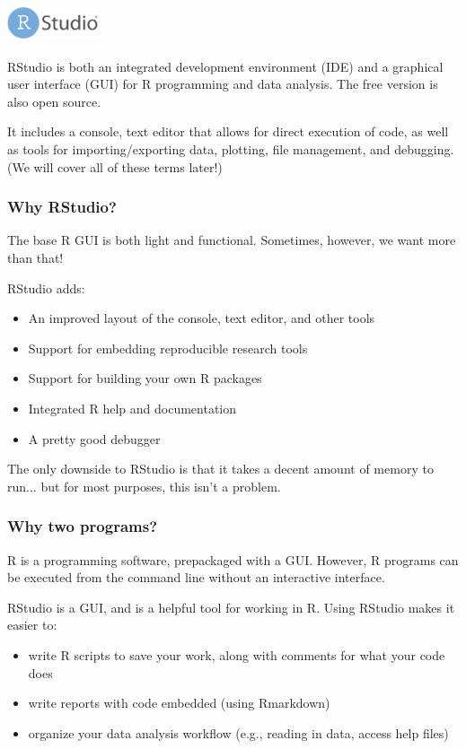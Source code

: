 \documentclass[11pt]{beamer}
\newcommand{\myframe}[1]{\begin{frame} \frametitle{#1}}
\newenvironment{spaceitemize}
{ \begin{itemize}
    \setlength{\itemsep}{10pt}
    \setlength{\parskip}{0pt}
    \setlength{\parsep}{0pt}     }
{ \end{itemize}                  }
\begin{document}
\myframe{\includegraphics[width = 0.2\textwidth]{figs/RStudiologo.png}}
RStudio is both an integrated development environment (IDE) and a graphical user interface (GUI) for R programming and data analysis. The free version is also open source.

It includes a console, text editor that allows for direct execution of code, as well as tools for importing/exporting data, plotting, file management, and debugging. (We will cover all of these terms later!)
\end{frame}

\myframe{Why RStudio?}
The base R GUI is both light and functional. Sometimes, however, we want more than that!

RStudio adds:
\begin{spaceitemize}
\item An improved layout of the console, text editor, and other tools
\item Support for embedding reproducible research tools
\item Support for building your own R packages
\item Integrated R help and documentation
\item A pretty good debugger
\end{spaceitemize}

The only downside to RStudio is that it takes a decent amount of memory to run... but for most purposes, this isn't a problem. 
\end{frame}


\myframe{Why two programs?}
R is a programming software, prepackaged with a GUI. However, R programs can be executed from the command line without an interactive interface.

RStudio is a GUI, and is a helpful tool for working in R. Using RStudio makes it easier to:
\begin{spaceitemize}
\item write R scripts to save your work, along with comments for what your code does
\item write reports with code embedded (using Rmarkdown)
\item organize your data analysis workflow (e.g., reading in data, access help files)
\end{spaceitemize}
\end{frame}
\end{document}

